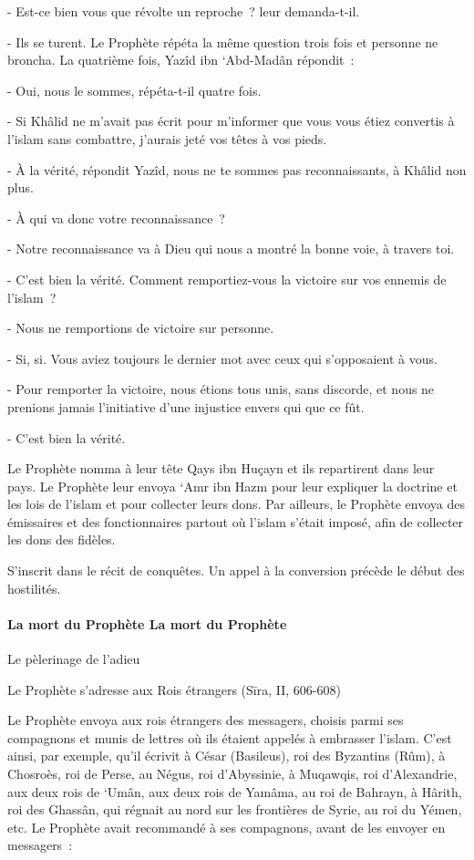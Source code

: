 {- Est-ce bien vous que révolte un reproche~? leur demanda-t-il.}

{- Ils se turent. Le Prophète répéta la même question trois fois et
personne ne broncha. La quatrième fois, Yazîd ibn `Abd-Madân répondit~:}

{- Oui, nous le sommes, répéta-t-il quatre fois.}

{- Si Khâlid ne m'avait pas écrit pour m'informer que vous vous
étiez convertis à l'islam sans combattre, j'aurais jeté vos têtes à vos
pieds.}

{- À la vérité, répondit Yazîd, nous ne te sommes pas
reconnaissants, à Khâlid non plus.}

{- À qui va donc votre reconnaissance~?}

{- Notre reconnaissance va à Dieu qui nous a montré la bonne voie,
à travers toi.}

{- C'est bien la vérité. Comment remportiez-vous la victoire sur
vos ennemis de l'islam~?}

{- Nous ne remportions de victoire sur personne.}

{- Si, si. Vous aviez toujours le dernier mot avec ceux qui
s'opposaient à vous.}

{- Pour remporter la victoire, nous étions tous unis, sans
discorde, et nous ne prenions jamais l'initiative d'une injustice envers
qui que ce fût.}

{- C'est bien la vérité.}

{Le Prophète nomma à leur tête Qays ibn Huçayn et ils repartirent
dans leur pays. Le Prophète leur envoya `Amr ibn Hazm pour leur
expliquer la doctrine et les lois de l'islam et pour collecter leurs
dons. Par ailleurs, le Prophète envoya des émissaires et des
fonctionnaires partout où l'islam s'était imposé, afin de collecter les
dons des fidèles.}

S'inscrit dans le récit de conquêtes. Un appel à la conversion précède
le début des hostilités.


\paragraph{{La mort du Prophète
}{La mort du Prophète }}

Le pèlerinage de l'adieu

Le Prophète s'adresse aux Rois étrangers (Sīra, II, 606-608)

{Le Prophète envoya aux rois étrangers des messagers, choisis parmi
ses compagnons et munis de lettres où ils étaient appelés à embrasser
l'islam. C'est ainsi, par exemple, qu'il écrivit à César (Basileus), roi
des Byzantins (Rûm), à Chosroès, roi de Perse, au Négus, roi
d'Abyssinie, à Muqawqis, roi d'Alexandrie, aux deux rois de `Umân, aux
deux rois de Yamâma, au roi de Bahrayn, à Hârith, roi des Ghassân, qui
régnait au nord sur les frontières de Syrie, au roi du Yémen, etc. Le
Prophète avait recommandé à ses compagnons, avant de les envoyer en
messagers~:}

